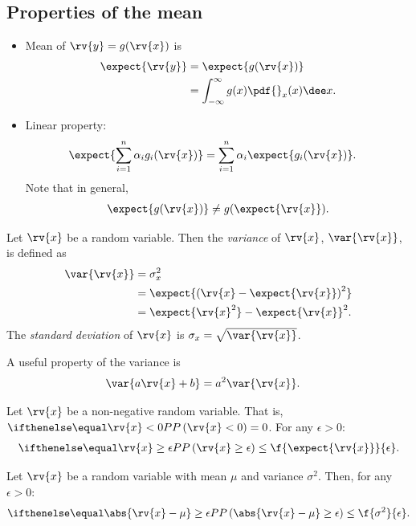 \subsection*{Properties of the mean}
\begin{itemize}
    \item Mean of $\rv{y}=g(\rv{x})$ is
    \begin{align}
        \expect{\rv{y}} &= \expect{g(\rv{x})}\\
        &= \int_{-\infty}^{\infty}g(x)\pdf{}_{x}(x)\dee x.
    \end{align}
    \item Linear property:
    \begin{align}
        \expect{\sum_{i=1}^{n}\alpha_{i}g_{i}(\rv{x})} &= \sum_{i=1}^{n}\alpha_{i}\expect{g_{i}(\rv{x})}.
    \end{align}
    Note that in general,
    \begin{align}
        \expect{g(\rv{x})} \neq g(\expect{\rv{x}}).
    \end{align}
\end{itemize}

\begin{mydefinition}
  Let $\rv{x}$ be a random variable. Then the \emph{variance} of $\rv{x}$, $\var{\rv{x}}$, is defined as
  \begin{align}
      \var{\rv{x}} &= \sigma_{x}^{2}\\
      &= \expect{\left(\rv{x}-\expect{\rv{x}}\right)^2}\\
      &= \expect{\rv{x}^2} - \expect{\rv{x}}^2.
  \end{align}
  The \emph{standard deviation} of $\rv{x}$ is $\sigma_{x} = \sqrt{\var{\rv{x}}}$.

  A useful property of the variance is
  \begin{align}
      \var{a\rv{x}+b} &= a^2\var{\rv{x}}.
  \end{align}
\end{mydefinition}

\begin{mytheorem}
    Let $\rv{x}$ be a non-negative random variable. That is, $\prob{\rv{x}<0}=0$. For any $\epsilon>0$:
    \begin{align}
        \prob{\rv{x}\geq \epsilon} \leq \f{\expect{\rv{x}}}{\epsilon}.
    \end{align}
\end{mytheorem}

\begin{mytheorem}
    Let $\rv{x}$ be a random variable with mean $\mu$ and variance $\sigma^2$. Then, for any $\epsilon>0$:
    \begin{align}
        \prob{\abs{\rv{x}-\mu}\geq \epsilon} \leq \f{\sigma^2}{\epsilon}.
    \end{align}
\end{mytheorem}

